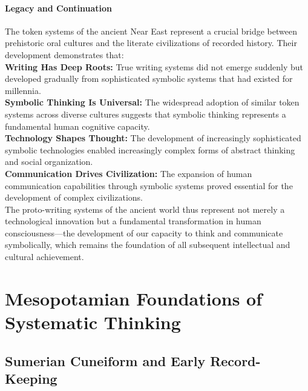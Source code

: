 \documentclass[12pt, oneside, openany]{book}
\begin{document}
\subsubsection{Legacy and Continuation}

The token systems of the ancient Near East represent a crucial bridge between prehistoric oral cultures and the literate civilizations of recorded history. Their development demonstrates that:\\
\textbf{Writing Has Deep Roots:} True writing systems did not emerge suddenly but developed gradually from sophisticated symbolic systems that had existed for millennia.\\
\textbf{Symbolic Thinking Is Universal:} The widespread adoption of similar token systems across diverse cultures suggests that symbolic thinking represents a fundamental human cognitive capacity.\\
\textbf{Technology Shapes Thought:} The development of increasingly sophisticated symbolic technologies enabled increasingly complex forms of abstract thinking and social organization.\\
\textbf{Communication Drives Civilization:} The expansion of human communication capabilities through symbolic systems proved essential for the development of complex civilizations.\\
The proto-writing systems of the ancient world thus represent not merely a technological innovation but a fundamental transformation in human consciousness—the development of our capacity to think and communicate symbolically, which remains the foundation of all subsequent intellectual and cultural achievement.


\chapter{Mesopotamian Foundations of Systematic Thinking}

\section{Sumerian Cuneiform and Early Record-Keeping}
\end{document}
